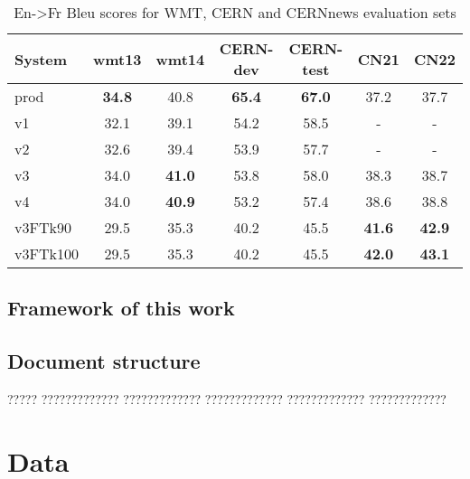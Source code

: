 \documentclass[11pt,english,listoffigures,listoftables]{tfgetsinf}
\begin{document}
\begin{table}
\caption{En->Fr Bleu scores for WMT, CERN and CERNnews evaluation sets}
\centering
\begin{tabular}{l|c|c|c|c|c|c}\label{transformer:wmt:r}
System & wmt13 & wmt14 & CERN-dev & CERN-test & CN21 & CN22 \\
\hline
prod & \textbf{34.8} & 40.8 & \textbf{65.4} & \textbf{67.0} 
& 37.2 & 37.7\\
v1 & 32.1 & 39.1 & 54.2 & 58.5& - & - \\
v2 & 32.6 & 39.4 & 53.9 & 57.7& - & - \\
v3 & 34.0 & \textbf{41.0} & 53.8 & 58.0 & 38.3 & 38.7\\
v4 & 34.0 & \textbf{40.9} & 53.2 & 57.4 & 38.6 & 38.8\\
v3FTk90 & 29.5 & 35.3 & 40.2 & 45.5 & \textbf{41.6} & \textbf{42.9}\\
v3FTk100 & 29.5 & 35.3 & 40.2 & 45.5 & \textbf{42.0} & \textbf{43.1}\\
\end{tabular}
\end{table}


\section{Framework of this work}

\section{Document structure}

????? ????????????? ????????????? ????????????? ????????????? ????????????? 




\chapter{Data}
\end{document}
